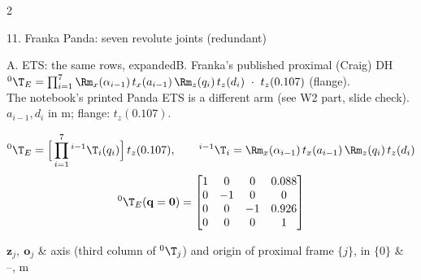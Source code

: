 \begin{multicols}{2}
\begin{rbhead}{11. Franka Panda: seven revolute joints (redundant)}
\noindent\begin{minipage}[c]{0.46\linewidth}\end{minipage}\hfill
\begin{minipage}[c]{0.52\linewidth}\end{minipage}
\end{rbhead}
\begin{twoway}{A. ETS: the same rows, expanded}{B. Franka's published proximal (Craig) DH}
${}^0\T_E=\prod_{i=1}^{7}\Rm_x(\alpha_{i-1})\,t_x(a_{i-1})\,\Rm_z(q_i)\,t_z(d_i)\ \cdot\ t_z(0.107)$ (flange).\\ The notebook's printed Panda ETS is a different arm (see W2 part, slide check).
\tcblower
{}\\ $a_{i-1},d_i$ in m; flange: $t_z(0.107)$.
\end{twoway}
\begin{fbx}
\[{}^0\T_E=\Big[\prod_{i=1}^{7}{}^{i-1}\T_i(q_i)\Big]\,t_z(0.107),\qquad{}^{i-1}\T_i=\Rm_x(\alpha_{i-1})\,t_x(a_{i-1})\,\Rm_z(q_i)\,t_z(d_i)\]
\[{}^0\T_E(\mathbf q=\mathbf 0)=\begin{bmatrix}1&0&0&0.088\\0&-1&0&0\\0&0&-1&0.926\\0&0&0&1\end{bmatrix}\]
\begin{symbols}
$\mathbf z_j,\ \mathbf o_j$ & axis (third column of ${}^0\T_j$) and origin of proximal frame $\{j\}$, in $\{0\}$ & --, m\\

\end{symbols}
\end{fbx}
\end{multicols}
